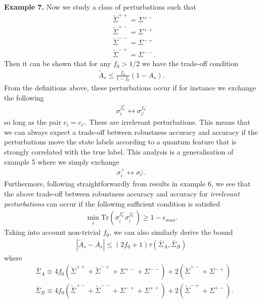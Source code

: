 \documentclass[onecolumn,prx, superscriptaddress,longbibliography,margin=1mm 11pt]{revtex4-2}
\begin{document}
\noindent \textbf{Example 7.}
    Now we study a class of perturbations such that 
\begin{align}
    & \tilde{\Sigma}^{++}=\Sigma^{+-} \nonumber \\
    & \tilde{\Sigma}^{+-}=\Sigma^{++} \nonumber \\
    & \tilde{\Sigma}^{--}=\Sigma^{-+} \nonumber \\
    &\tilde{\Sigma}^{-+}=\Sigma^{--}.
\end{align}
Then it can be shown that for any $f_0>1/2$ we have the trade-off condition
\begin{align}
    \tilde{A}_s \leq \frac{f_0}{1-f_0}(1-A_s).
\end{align}
From the definitions above, these perturbations occur if for instance we exchange the following
\begin{align}
    \sigma^{f_0^+}_i \leftrightarrow \sigma^{f_0^-}_{i'}
\end{align}
so long as the pair $c_i=c_{i'}$. These are irrelevant perturbations. This means that we can always expect a trade-off between robustness accuracy and accuracy if the perturbations move the state labels according to a quantum feature that is strongly correlated with the true label. This analysis is a generalisation of example 5 where we simply exchange
\begin{align}
      \sigma^{+}_i \leftrightarrow \sigma^{-}_{i'}.
\end{align}
Furthermore, following straightforwardly from results in example 6, we see that the above trade-off between robustness accuracy and accuracy for \textit{irrelevant perturbations} can occur if the following sufficient condition is satisfied 
\begin{align}
    \min_i \text{Tr}(\sigma_i^{f_0^+}\sigma_i^{f_0^-}) \geq 1-\epsilon_{max}.
\end{align}
Taking into account non-trivial $f_0$, we can also similarly derive the bound 
\begin{align}
    |\tilde{A}_s-A_s| \leq (2f_0+1)\tau(\bar{\Sigma}_A, \bar{\Sigma}_B)
\end{align}
where 
\begin{align}
    & \bar{\Sigma}_A \equiv 4f_0(\tilde{\Sigma}^{++}+\tilde{\Sigma}^{-+}+\Sigma^{+-}+\Sigma^{--})+2(\tilde{\Sigma}^{+-}+\Sigma^{-+}) \nonumber \\
    & \bar{\Sigma}_B \equiv 4f_0(\tilde{\Sigma}^{+-}+\tilde{\Sigma}^{--}+\Sigma^{-+}+\Sigma^{++})+2(\tilde{\Sigma}^{-+}+\Sigma^{+-}).
\end{align}
\end{document}
